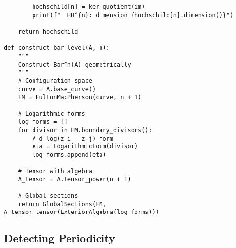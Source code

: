 \begin{algorithm}
\begin{verbatim}
        hochschild[n] = ker.quotient(im)
        print(f"  HH^{n}: dimension {hochschild[n].dimension()}")
    
    return hochschild

def construct_bar_level(A, n):
    """
    Construct Bar^n(A) geometrically
    """
    # Configuration space
    curve = A.base_curve()
    FM = FultonMacPherson(curve, n + 1)
    
    # Logarithmic forms
    log_forms = []
    for divisor in FM.boundary_divisors():
        # d log(z_i - z_j) form
        eta = LogarithmicForm(divisor)
        log_forms.append(eta)
    
    # Tensor with algebra
    A_tensor = A.tensor_power(n + 1)
    
    # Global sections
    return GlobalSections(FM, A_tensor.tensor(ExteriorAlgebra(log_forms)))
\end{verbatim}
\end{algorithm}

\subsection{Detecting Periodicity}

